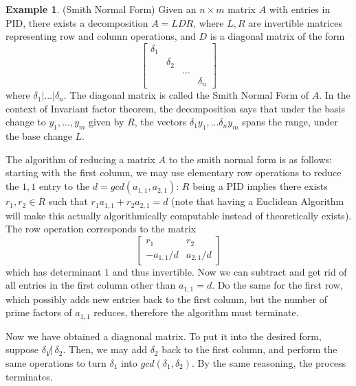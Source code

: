 \documentclass{article}
\theoremstyle{definition}
\theoremstyle{definition}
\theoremstyle{definition}
\theoremstyle{definition}
\theoremstyle{definition}
\theoremstyle{definition}
\theoremstyle{definition}
\newtheorem{example}{Example}[section]
\begin{document}
\begin{tcolorbox}[colback=yellow!5!white,colframe=yellow!30!white]
\begin{example}
(Smith Normal Form) Given an $n\times m$ matrix $A$ with entries in PID, there exists a decomposition $A=LDR$, where $L,R$ are invertible matrices representing row and column operations, and $D$ is a diagonal matrix of the form 
\[
\begin{bmatrix}
\delta_1\\
&\delta_2\\
&&...\\
&&&\delta_n
\end{bmatrix}\]
where $\delta_1|...|\delta_n$. The diagonal matrix is called the Smith Normal Form of $A$. In the context of Invariant factor theorem, the decomposition says that under the basis change to $y_1,...,y_m$ given by $R$, the vectors $\delta_1y_1,...\delta_ny_m$ spans the range, under the base change $L$.
\end{example}
\end{tcolorbox}
The algorithm of reducing a matrix $A$ to the smith normal form is as follows: starting with the first column, we may use elementary row operations to reduce the $1,1$ entry to the $d=gcd(a_{1,1},a_{2,1})$: $R$ being a PID implies there exists $r_1,r_2\in R$ such that $r_1a_{1,1}+r_2a_{2,1}=d$ (note that having a Euclidean Algorithm will make this actually algorithmically computable instead of theoretically exists). The row operation corresponds to the matrix 
\[
\begin{bmatrix}
r_1& r_2\\
-a_{1,1}/d& a_{2,1}/d
\end{bmatrix}\]
which has determinant $1$ and thus invertible. Now we can subtract and get rid of all entries in the first column other than $a_{1,1}=d$. Do the same for the first row, which possibly adds new entries back to the first column, but the number of prime factors of $a_{1,1}$ reduces, therefore the algorithm must terminate.

Now we have obtained a diagnonal matrix. To put it into the desired form, suppose $\delta_1 \not| \ \delta_2$. Then, we may add $\delta_2$ back to the first column, and perform the same operations to turn $\delta_1$ into $gcd(\delta_1,\delta_2)$. By the same reasoning, the process terminates. 
\end{document}
